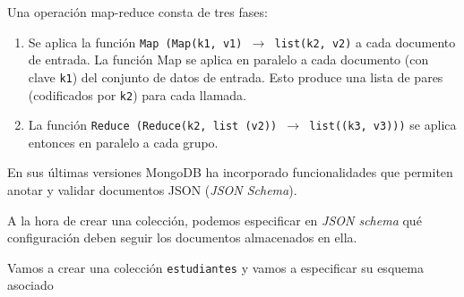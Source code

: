 Una operación map-reduce consta de tres fases:
\begin{enumerate}[label=\arabic*)]
	\item Se aplica la función \texttt{Map (Map(k1, v1) $\rightarrow$ list(k2, v2)} a cada documento de entrada. La función Map se aplica en paralelo a cada documento (con clave \texttt{k1}) del conjunto de datos de entrada. Esto produce una lista de pares (codificados por \texttt{k2}) para cada llamada.
	\item La función \texttt{Reduce (Reduce(k2, list (v2)) $\rightarrow$ list((k3, v3)))} se aplica entonces en paralelo a cada grupo.
\end{enumerate}
En sus últimas versiones MongoDB ha incorporado funcionalidades que permiten anotar y validar documentos JSON (\textit{JSON Schema}).

A la hora de crear una colección, podemos especificar en \textit{JSON schema} qué configuración deben seguir los documentos almacenados en ella.

\Ej 

Vamos a crear una colección \texttt{estudiantes} y vamos a especificar su esquema asociado

